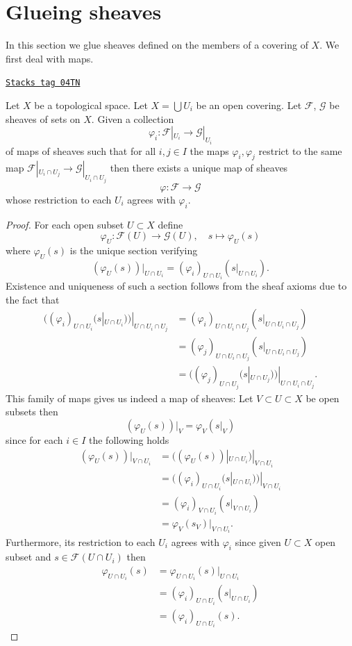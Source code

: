 \section{Glueing sheaves}
\label{sheaves-section-glueing-sheaves}
In this section we glue sheaves defined on the members of a covering of $X$.
We first deal with maps.

\begin{lemma}
\label{sheaves-lemma-glue-maps}
\href{https://stacks.math.columbia.edu/tag/04TN}{\texttt{Stacks tag 04TN}}

Let $X$ be a topological space.
Let $X = \bigcup U_i$ be an open covering.
Let $\mathcal{F}$, $\mathcal{G}$ be sheaves of sets on $X$.
Given a collection
$$
\varphi_i :
\mathcal{F}|_{U_i}
\longrightarrow
\mathcal{G}|_{U_i}
$$
of maps of sheaves such that for all $i, j \in I$ the maps
$\varphi_i, \varphi_j$ restrict to the same map
$\mathcal{F}|_{U_i \cap U_j} \to \mathcal{G}|_{U_i \cap U_j}$
then there exists a unique map of sheaves
$$
\varphi :
\mathcal{F}
\longrightarrow
\mathcal{G}
$$
whose restriction to each $U_i$ agrees with $\varphi_i$.
\end{lemma}

\begin{proof}
For each open subset $U \subset X$ define
$$
\varphi_U : \mathcal{F}(U) \to \mathcal{G}(U), \quad
s \mapsto \varphi_U(s)
$$
where $\varphi_U(s)$ is the unique section verifying
$$
(\varphi_U(s))|_{U \cap U_i}
= (\varphi_i)_{U \cap U_i}(s|_{U \cap U_i}).
$$
Existence and uniqueness of such a section
follows from the sheaf axioms
due to the fact that
\begin{align*}
((\varphi_i)_{U \cap U_i}(s|_{U \cap U_i}))|_{U \cap U_i \cap U_j}
&= (\varphi_i)_{U \cap U_i \cap U_j}(s|_{U \cap U_i \cap U_j})\\
&= (\varphi_j)_{U \cap U_i \cap U_j}(s|_{U \cap U_i \cap U_j})\\
&= ((\varphi_j)_{U \cap U_j}(s|_{U \cap U_j}))|_{U \cap U_i \cap U_j}.
\end{align*}
This family of maps gives us indeed a map of sheaves:
Let $V \subset U \subset X$ be open subsets then
$$
(\varphi_U(s))|_V
= \varphi_V(s|_V)
$$
since for each $i \in I$ the following holds
\begin{align*}
(\varphi_U(s))|_{V \cap U_i}
&= ((\varphi_U(s))|_{U \cap U_i})|_{V \cap U_i}\\
&= ((\varphi_i)_{U \cap U_i}(s|_{U \cap U_i}))|_{V \cap U_i}\\
&= (\varphi_i)_{V \cap U_i}(s|_{V \cap U_i})\\
&= \varphi_V(s_{V})|_{V \cap U_i}.
\end{align*}
Furthermore,
its restriction to each $U_i$ agrees with $\varphi_i$
since given $U \subset X$ open subset
and $s \in \mathcal{F}(U \cap U_i)$ then
\begin{align*}
\varphi_{U \cap U_i}(s)
&= \varphi_{U \cap U_i}(s)|_{U \cap U_i}\\
&= (\varphi_i)_{U \cap U_i}(s|_{U \cap U_i})\\
&= (\varphi_i)_{U \cap U_i}(s).
\end{align*}
\end{proof}

